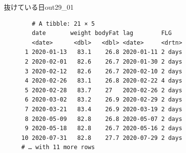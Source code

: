 \begin{Rscreen}{抜けている日}{out29_01}
	\begin{verbatim}
        # A tibble: 21 × 5
        date       weight bodyFat lag        FLG   
        <date>      <dbl>   <dbl> <date>     <drtn>
      1 2020-01-13   83.1    26.8 2020-01-11 2 days
      2 2020-02-01   82.6    26.7 2020-01-30 2 days
      3 2020-02-12   82.6    26.7 2020-02-10 2 days
      4 2020-02-26   83.1    26.8 2020-02-22 4 days
      5 2020-02-28   83.7    27   2020-02-26 2 days
      6 2020-03-02   83.2    26.9 2020-02-29 2 days
      7 2020-03-21   83.4    26.9 2020-03-19 2 days
      8 2020-05-09   82.8    26.8 2020-05-07 2 days
      9 2020-05-18   82.8    26.7 2020-05-16 2 days
     10 2020-07-31   82.8    27.7 2020-07-29 2 days
     # … with 11 more rows\end{verbatim}
\end{Rscreen}
